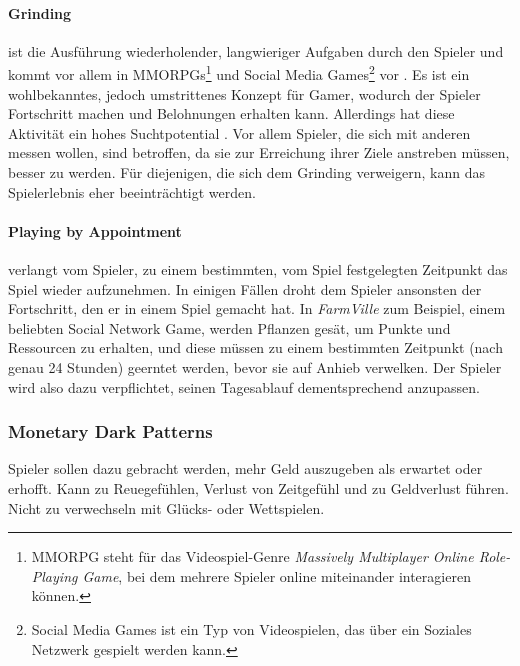 \documentclass[a4paper]{article}
\begin{document}
\paragraph{Grinding} ist die Ausführung wiederholender, langwieriger Aufgaben durch den Spieler und kommt vor allem in MMORPGs\footnote{\label{foot:8} MMORPG steht für das Videospiel-Genre \textit{Massively Multiplayer Online Role-Playing Game}, bei dem mehrere Spieler online miteinander interagieren können.} und Social Media Games\footnote{\label{foot:9} Social Media Games ist ein Typ von Videospielen, das über ein Soziales Netzwerk gespielt werden kann.} vor \cite{nakamura}. Es ist ein wohlbekanntes, jedoch umstrittenes Konzept für Gamer, wodurch der Spieler Fortschritt machen und Belohnungen erhalten kann. Allerdings hat diese Aktivität ein hohes Suchtpotential \cite{king}.\newline 
Vor allem Spieler, die sich mit anderen messen wollen, sind betroffen, da sie zur Erreichung ihrer Ziele anstreben müssen, besser zu werden. Für diejenigen, die sich dem Grinding verweigern, kann das Spielerlebnis eher beeinträchtigt werden. 

\paragraph{Playing by Appointment} verlangt vom Spieler, zu einem bestimmten, vom Spiel festgelegten Zeitpunkt das Spiel wieder aufzunehmen. In einigen Fällen droht dem Spieler ansonsten der Fortschritt, den er in einem Spiel gemacht hat.\newline
In \textit{FarmVille} zum Beispiel, einem beliebten Social Network Game, werden Pflanzen gesät, um Punkte und Ressourcen zu erhalten, und diese müssen zu einem bestimmten Zeitpunkt (nach genau 24 Stunden) geerntet werden, bevor sie auf Anhieb verwelken. Der Spieler wird also dazu verpflichtet, seinen Tagesablauf dementsprechend anzupassen.

\subsubsection{Monetary Dark Patterns}
Spieler sollen dazu gebracht werden, mehr Geld auszugeben als erwartet oder erhofft. Kann zu Reuegefühlen, Verlust von Zeitgefühl und zu Geldverlust führen.\newline
Nicht zu verwechseln mit Glücks- oder Wettspielen.
\end{document}
